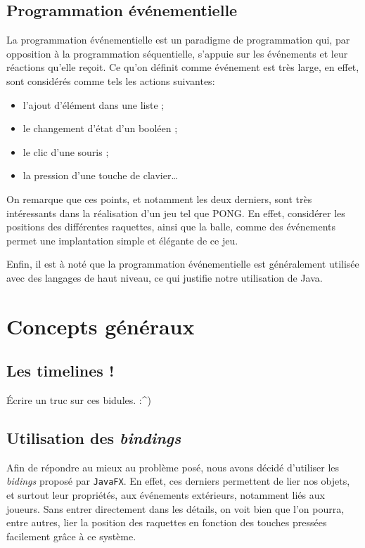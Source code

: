 \documentclass[a4paper,10pt]{article}
\theoremstyle{definition}
\begin{document}
  \subsection{Programmation événementielle}
	La programmation événementielle est un paradigme de programmation qui, par opposition à la programmation séquentielle, s'appuie sur les événements et leur réactions qu'elle reçoit. Ce qu'on définit comme \og événement \fg{} est très large, en effet, sont considérés comme tels les actions suivantes:
	\begin{itemize}
		\item l'ajout d'élément dans une liste ;
		\item le changement d'état d'un booléen ;
		\item le clic d'une souris ;
		\item la pression d'une touche de clavier\dots
	\end{itemize} 
	
	On remarque que ces points, et notamment les deux derniers, sont très intéressants dans la réalisation d'un jeu tel que PONG. En effet, considérer les positions des différentes raquettes, ainsi que la balle, comme des événements permet une implantation simple et élégante de ce jeu.
	
	Enfin, il est à noté que la programmation événementielle est généralement utilisée avec des langages de haut niveau, ce qui justifie notre utilisation de Java.
	
\section{Concepts généraux}
%

    \subsection{Les timelines !}
    Écrire un truc sur ces bidules. :\^{})
    
    \subsection{Utilisation des \emph{bindings}}
    Afin de répondre au mieux au problème posé, nous avons décidé d'utiliser les \emph{bidings} proposé par \lstinline{JavaFX}. En effet, ces derniers permettent de lier nos objets, et surtout leur propriétés, aux événements extérieurs, notamment liés aux joueurs. Sans entrer directement dans les détails, on voit bien que l'on pourra, entre autres, lier la position des raquettes en fonction des touches pressées facilement grâce à ce système.
    
\end{document}
